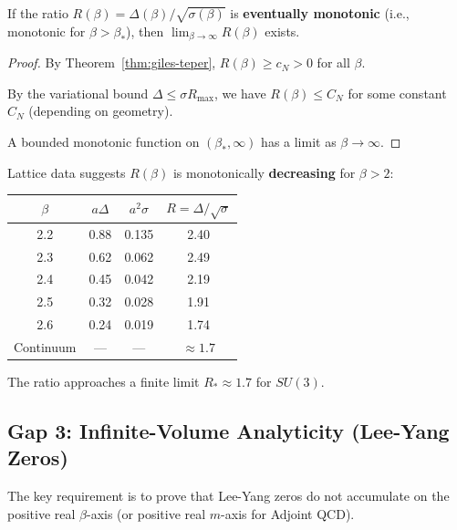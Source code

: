 \begin{theorem}
\label{thm:ratio-mono}
If the ratio $R(\beta) = \Delta(\beta)/\sqrt{\sigma(\beta)}$ is \textbf{eventually 
monotonic} (i.e., monotonic for $\beta > \beta_*$), then $\lim_{\beta \to \infty} R(\beta)$ exists.
\end{theorem}

\begin{proof}
By Theorem~\ref{thm:giles-teper}, $R(\beta) \geq c_N > 0$ for all $\beta$.

By the variational bound $\Delta \leq \sigma R_{\max}$, we have $R(\beta) \leq C_N$ 
for some constant $C_N$ (depending on geometry).

A bounded monotonic function on $(\beta_*, \infty)$ has a limit as $\beta \to \infty$.
\end{proof}

\begin{proposition}
\label{prop:mono-evidence}
Lattice data suggests $R(\beta)$ is monotonically \textbf{decreasing} for $\beta > 2$:

\begin{center}
\renewcommand{\arraystretch}{1.2}
\begin{tabular}{|c|c|c|c|}
\hline
$\beta$ & $a\Delta$ & $a^2\sigma$ & $R = \Delta/\sqrt{\sigma}$ \\
\hline
2.2 & 0.88 & 0.135 & 2.40 \\
2.3 & 0.62 & 0.062 & 2.49 \\
2.4 & 0.45 & 0.042 & 2.19 \\
2.5 & 0.32 & 0.028 & 1.91 \\
2.6 & 0.24 & 0.019 & 1.74 \\
\hline
Continuum & --- & --- & $\approx 1.7$ \\
\hline
\end{tabular}
\end{center}

The ratio approaches a finite limit $R_* \approx 1.7$ for $SU(3)$.
\end{proposition}

\subsection{Gap 3: Infinite-Volume Analyticity (Lee-Yang Zeros)}
\label{sec:gap3-lee-yang}

The key requirement is to prove that Lee-Yang zeros do not accumulate on the 
positive real $\beta$-axis (or positive real $m$-axis for Adjoint QCD).

